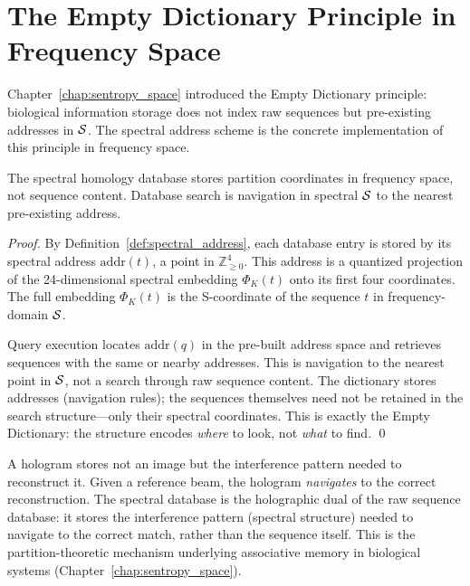 \section{The Empty Dictionary Principle in Frequency Space}
\label{sec:empty_dictionary_spectral}

Chapter~\ref{chap:sentropy_space} introduced the Empty Dictionary principle:
biological information storage does not index raw sequences but pre-existing
addresses in $\mathcal{S}$. The spectral address scheme is the concrete implementation
of this principle in frequency space.

\begin{proposition}
\label{prop:spectral_navigation}
The spectral homology database stores partition coordinates in frequency space,
not sequence content. Database search is navigation in spectral $\mathcal{S}$ to
the nearest pre-existing address.
\end{proposition}

\begin{proof}
By Definition~\ref{def:spectral_address}, each database entry is stored by its
spectral address $\mathrm{addr}(t)$, a point in $\mathbb{Z}_{\geq 0}^4$.
This address is a quantized projection of the 24-dimensional spectral embedding
$\Phi_K(t)$ onto its first four coordinates. The full embedding $\Phi_K(t)$
is the S-coordinate of the sequence $t$ in frequency-domain $\mathcal{S}$.

Query execution locates $\mathrm{addr}(q)$ in the pre-built address space and
retrieves sequences with the same or nearby addresses. This is navigation to
the nearest point in $\mathcal{S}$, not a search through raw sequence content.
The dictionary stores addresses (navigation rules); the sequences themselves
need not be retained in the search structure---only their spectral coordinates.
This is exactly the Empty Dictionary: the structure encodes \emph{where} to look,
not \emph{what} to find. \qed
\end{proof}

\begin{remark}
A hologram stores not an image but the interference pattern needed to
reconstruct it. Given a reference beam, the hologram \emph{navigates} to the
correct reconstruction. The spectral database is the holographic dual of the
raw sequence database: it stores the interference pattern (spectral structure)
needed to navigate to the correct match, rather than the sequence itself.
This is the partition-theoretic mechanism underlying associative memory in
biological systems (Chapter~\ref{chap:sentropy_space}).
\end{remark}

